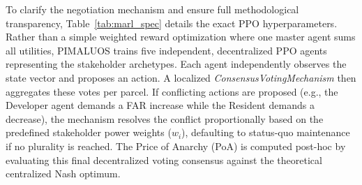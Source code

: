 \documentclass[final,3p,times]{elsarticle}
\begin{document}
\begin{table}[htbp]
\centering
\caption{Formal definitions, mathematical formulations, and data sources for the Equity Advocate metrics.}
\label{tab:equity_metrics}
\end{table}

To clarify the negotiation mechanism and ensure full methodological transparency, Table~\ref{tab:marl_spec} details the exact PPO hyperparameters. Rather than a simple weighted reward optimization where one master agent sums all utilities, PIMALUOS trains five independent, decentralized PPO agents representing the stakeholder archetypes. Each agent independently observes the state vector and proposes an action. A localized \textit{ConsensusVotingMechanism} then aggregates these votes per parcel. If conflicting actions are proposed (e.g., the Developer agent demands a FAR increase while the Resident demands a decrease), the mechanism resolves the conflict proportionally based on the predefined stakeholder power weights ($w_i$), defaulting to status-quo maintenance if no plurality is reached. The Price of Anarchy (PoA) is computed post-hoc by evaluating this final decentralized voting consensus against the theoretical centralized Nash optimum.
\end{document}
